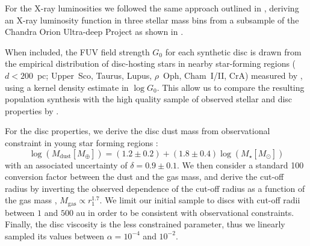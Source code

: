 \documentclass[fleqn,usenatbib]{mnras}
\begin{document}
For the X-ray luminosities we followed the same approach outlined in \citet{2023MNRAS.526L.105E}, deriving an X-ray luminosity function in three stellar mass bins from a subsample of the Chandra Orion Ultra-deep Project \citep[COUP, cf.][]{2005ApJS..160..319G} as shown in \citet{2019ApJ...883..117K}.

When included, the FUV field strength $G_0$ for each synthetic disc is drawn from the empirical distribution of disc-hosting stars in nearby star-forming regions ($d < 200$~pc; Upper~Sco, Taurus, Lupus, $\rho$~Oph, Cham~I/II, CrA) measured by \citet{2025A&A...695A..74A}, using a kernel density estimate in $\log G_0$. This allow us to compare the resulting population synthesis with the high quality sample of observed stellar and disc properties by \citet{2023ASPC..534..539M}.

For the disc properties, we derive the disc dust mass from observational constraint in young star forming regions \citep{2016ApJ...831..125P, 2017AJ....153..240A}:
\begin{equation}
    \log(M_\mathrm{dust} [M_\oplus]) = (1.2\pm0.2) + (1.8\pm0.4) \log(M_\star [M_\odot])
\end{equation}
with an associated uncertainty of $\delta = 0.9\pm0.1$.
We then consider a standard 100 conversion factor between the dust and the gas mass, and derive the cut-off radius by inverting the observed dependence of the cut-off radius as a function of the gas mass \citep{Trapman_2025}, $M_\mathrm{gas} \propto r_1^{1.7}$. We limit our initial sample to discs with cut-off radii between $1$ and $500$ au in order to be consistent with observational constraints. Finally, the disc viscosity is the less constrained parameter, thus we linearly sampled its values between $\alpha = 10^{-4}$ and $10^{-2 }$.
\end{document}
